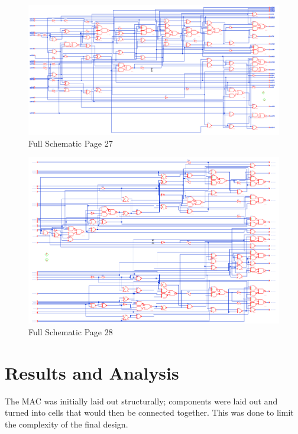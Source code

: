 \documentclass[11pt]{article}
\begin{document}
		
		\begin{figure}[H] 
			\centering 
			\includegraphics[width=\textwidth,height=\dimexpr\textheight-4\baselineskip-\abovecaptionskip-\belowcaptionskip\relax,keepaspectratio]{"Pictures/Full Schematic Page 27"}
			\caption{Full Schematic Page 27} 
			\label{fig:Full-Schematic-Page-27} 
		\end{figure}
		
		
		\begin{figure}[H] 
			\centering 
			\includegraphics[width=\textwidth,height=\dimexpr\textheight-4\baselineskip-\abovecaptionskip-\belowcaptionskip\relax,keepaspectratio]{"Pictures/Full Schematic Page 28"}
			\caption{Full Schematic Page 28} 
			\label{fig:Full-Schematic-Page-28} 
		\end{figure}		
		

\section{Results and Analysis}
		
	The MAC was initially laid out structurally; components were laid out and turned into cells that would then be connected together. This was done to limit the complexity of the final design. 
	
\end{document}
